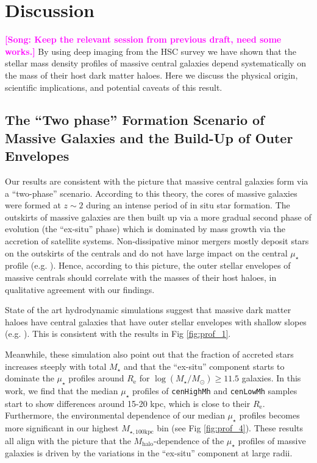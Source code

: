 \documentclass[a4paper,fleqn,usenatbib]{mnras}
\def\rbcg{\texttt{cenHighMh}}
\def\nbcg{\texttt{cenLowMh}}
\def\mstar{{$M_{\star}$}}
\def\mhalo{{$M_{\mathrm{halo}}$}}
\def\logms{{$\log (M_{\star}/M_{\odot})$}}
\def\mtot{{$M_{\star,100\mathrm{kpc}}$}}
\def\mden{{$\mu_{\star}$}}
\newcommand{\song}[1]{\textcolor{magenta}{\textbf{[Song: #1]}}}
\begin{document}
\section{Discussion}
    \label{sec:discussion}
    
    \song{Keep the relevant session from previous draft, need some works.}
    By using deep imaging from the HSC survey we have shown that the stellar mass 
    density profiles of massive central galaxies depend systematically on the mass 
    of their host dark matter haloes. 
    Here we discuss the physical origin, scientific implications, and potential 
    caveats of this result. 
    
    
\subsection{The ``Two phase'' Formation Scenario of Massive Galaxies and the 
            Build-Up of Outer Envelopes}
            
    Our results are consistent with the picture that massive central galaxies form via 
    a ``two-phase'' scenario. 
    According to this theory, the cores of massive galaxies were formed at $z{\sim} 2$ 
    during an intense period of in situ star formation. 
    The outskirts of massive galaxies are then built up via a more gradual second 
    phase of evolution (the ``ex-situ'' phase) which is dominated by mass growth via 
    the accretion of satellite systems. 
    Non-dissipative minor mergers mostly deposit stars on the outskirts of the 
    centrals and do not have large impact on the central \mden{} profile 
    (e.g. \citealt{Oogi2013, Bedorf2013}). 
    Hence, according to this picture, the outer stellar envelopes of massive centrals 
    should correlate with the masses of their host haloes, in qualitative agreement with
    our findings. 
          
    State of the art hydrodynamic simulations suggest that massive dark matter haloes 
    have central galaxies that have outer stellar envelopes with shallow slopes 
    (e.g. \citealt{Pillepich2014}). 
    This is consistent with the results in Fig \ref{fig:prof_1}.
     
    Meanwhile, these simulation also point out that the fraction of accreted stars 
    increases steeply with total \mstar{} and that the ``ex-situ'' component
    starts to dominate the \mden{} profiles around $R_{\mathrm{e}}$ for 
    \logms{}$\geq 11.5$ galaxies. 
    In this work, we find that the median \mden{} profiles of \rbcg{} and \nbcg{} 
    samples start to show differences around 15-20 kpc, which is close to 
    their $R_{\mathrm{e}}$. 
    Furthermore, the environmental dependence of our median \mden{} profiles 
    becomes more significant in our highest \mtot{} bin (see Fig \ref{fig:prof_4}). 
    These results all align with the picture that the \mhalo{}-dependence of the 
    \mden{} profiles of massive galaxies is driven by the variations in the 
    ``ex-situ'' component at large radii. 
   
\end{document}
